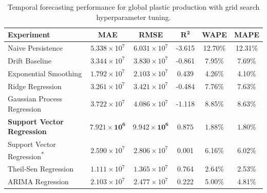 \begin{table}[!ht]
	\centering
	\caption{\centering Temporal forecasting performance for global plastic production with grid search hyperparameter tuning.}
	\begin{tabular}{@{}lccccc@{}}
		\toprule
		\textbf{Experiment}                          & \textbf{MAE}                   & \textbf{RMSE}                  & $\mathbf{R^2}$     & \textbf{WAPE}       & \textbf{MAPE}       \\
		\midrule
		Naive Persistence                            & \(5.338 \times 10^7\)          & \(6.031 \times 10^7\)          & -3.615             & 12.70\%             & 12.31\%             \\
		Drift Baseline                               & \(3.344 \times 10^7\)          & \(3.830 \times 10^7\)          & -0.861             & 7.95\%              & 7.69\%              \\
		Exponential Smoothing                        & \(1.792 \times 10^7\)          & \(2.103 \times 10^7\)          & 0.439              & 4.26\%              & 4.10\%              \\
		Ridge Regression                             & \(3.261 \times 10^7\)          & \(3.421 \times 10^7\)          & -0.484             & 7.76\%              & 7.63\%              \\
		Gaussian Process Regression                  & \(3.722 \times 10^7\)          & \(4.086 \times 10^7\)          & -1.118             & 8.85\%              & 8.63\%              \\
		\textbf{Support Vector Regression}           & \(\mathbf{7.921 \times 10^6}\) & \(\mathbf{9.942 \times 10^6}\) & \(\mathbf{0.875}\) & \(\mathbf{1.88}\)\% & \(\mathbf{1.80}\)\% \\
		Support Vector Regression\textsuperscript{*} & \(2.590 \times 10^7\)          & \(2.806 \times 10^7\)          & 0.001              & 6.16\%              & 6.02\%              \\
		Theil-Sen Regression                         & \(1.111 \times 10^7\)          & \(1.365 \times 10^7\)          & 0.764              & 2.64\%              & 2.53\%              \\
		ARIMA Regression                             & \(2.103 \times 10^7\)          & \(2.477 \times 10^7\)          & 0.222              & 5.00\%              & 4.81\%              \\
		\hline
	\end{tabular}
	\label{tab:global_forecasting_grid_search_metric_table}
\end{table}


